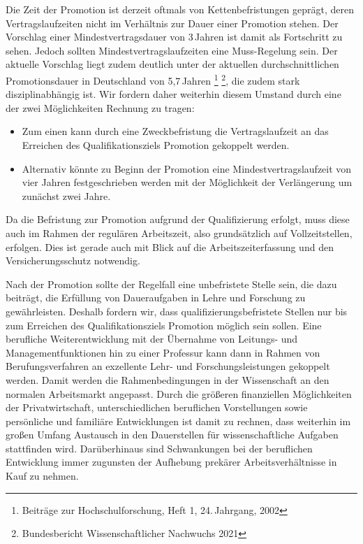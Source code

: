 \documentclass[DIV=calc]{scrartcl}
\begin{document}
Die Zeit der Promotion ist derzeit oftmals von Kettenbefristungen geprägt, deren Vertragslaufzeiten nicht im Verhältnis zur Dauer einer Promotion stehen. Der Vorschlag einer Mindestvertragsdauer von 3\,Jahren ist damit als Fortschritt zu sehen. Jedoch sollten Mindestvertragslaufzeiten eine Muss-Regelung sein. Der aktuelle Vorschlag liegt zudem deutlich unter der aktuellen durchschnittlichen Promotionsdauer in Deutschland von 5,7\,Jahren \footnote{Beiträge zur Hochschulforschung, Heft 1, 24.\,Jahrgang, 2002} \footnote{Bundesbericht Wissenschaftlicher Nachwuchs 2021}, die zudem stark disziplinabhängig ist. Wir fordern daher weiterhin diesem Umstand durch eine der zwei Möglichkeiten Rechnung zu tragen:
\begin{itemize}
    \item Zum einen kann durch eine Zweckbefristung die Vertragslaufzeit an das
Erreichen des Qualifikationsziels Promotion gekoppelt werden.
    \item Alternativ könnte zu Beginn der Promotion eine Mindestvertragslaufzeit
von vier Jahren festgeschrieben werden mit der Möglichkeit der Verlängerung um
zunächst zwei Jahre.
\end{itemize}
Da die Befristung zur Promotion aufgrund der Qualifizierung erfolgt, muss diese auch im Rahmen der regulären Arbeitszeit, also grundsätzlich auf Vollzeitstellen, erfolgen. Dies ist gerade auch mit Blick auf die Arbeitszeiterfassung und den Versicherungsschutz notwendig.

Nach der Promotion sollte der Regelfall eine unbefristete Stelle sein, die dazu beiträgt, die Erfüllung von Daueraufgaben in Lehre und Forschung zu gewährleisten. Deshalb fordern wir, dass qualifizierungsbefristete Stellen nur bis zum Erreichen des Qualifikationsziels Promotion möglich sein sollen. Eine berufliche Weiterentwicklung mit der Übernahme von Leitungs- und Managementfunktionen hin zu einer Professur kann dann in Rahmen von Berufungsverfahren an exzellente Lehr- und Forschungsleistungen gekoppelt werden. Damit werden die Rahmenbedingungen in der Wissenschaft an den normalen Arbeitsmarkt angepasst. Durch die größeren finanziellen Möglichkeiten der Privatwirtschaft, unterschiedlichen beruflichen Vorstellungen sowie persönliche und familiäre Entwicklungen ist damit zu rechnen, dass weiterhin im großen Umfang Austausch in den Dauerstellen für wissenschaftliche Aufgaben stattfinden wird. Darüberhinaus sind Schwankungen bei der beruflichen Entwicklung immer zugunsten der Aufhebung prekärer Arbeitsverhältnisse in Kauf zu nehmen.
\end{document}
